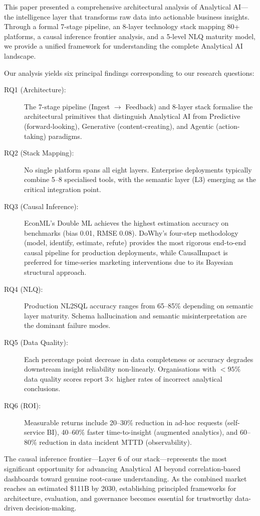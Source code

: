\documentclass[12pt, a4paper]{article}
\begin{document}
This paper presented a comprehensive architectural analysis of Analytical AI---the intelligence layer that transforms raw data into actionable business insights. Through a formal 7-stage pipeline, an 8-layer technology stack mapping 80+ platforms, a causal inference frontier analysis, and a 5-level NLQ maturity model, we provide a unified framework for understanding the complete Analytical AI landscape.

Our analysis yields six principal findings corresponding to our research questions:

\begin{description}
    \item[RQ1 (Architecture):] The 7-stage pipeline (Ingest $\rightarrow$ Feedback) and 8-layer stack formalise the architectural primitives that distinguish Analytical AI from Predictive (forward-looking), Generative (content-creating), and Agentic (action-taking) paradigms.
    \item[RQ2 (Stack Mapping):] No single platform spans all eight layers. Enterprise deployments typically combine 5--8 specialised tools, with the semantic layer (L3) emerging as the critical integration point.
    \item[RQ3 (Causal Inference):] EconML's Double ML achieves the highest estimation accuracy on benchmarks (bias 0.01, RMSE 0.08). DoWhy's four-step methodology (model, identify, estimate, refute) provides the most rigorous end-to-end causal pipeline for production deployments, while CausalImpact is preferred for time-series marketing interventions due to its Bayesian structural approach.
    \item[RQ4 (NLQ):] Production NL2SQL accuracy ranges from 65--85\% depending on semantic layer maturity. Schema hallucination and semantic misinterpretation are the dominant failure modes.
    \item[RQ5 (Data Quality):] Each percentage point decrease in data completeness or accuracy degrades downstream insight reliability non-linearly. Organisations with $<95\%$ data quality scores report 3$\times$ higher rates of incorrect analytical conclusions.
    \item[RQ6 (ROI):] Measurable returns include 20--30\% reduction in ad-hoc requests (self-service BI), 40--60\% faster time-to-insight (augmented analytics), and 60--80\% reduction in data incident MTTD (observability).
\end{description}

The causal inference frontier---Layer 6 of our stack---represents the most significant opportunity for advancing Analytical AI beyond correlation-based dashboards toward genuine root-cause understanding. As the combined market reaches an estimated \$111B by 2030, establishing principled frameworks for architecture, evaluation, and governance becomes essential for trustworthy data-driven decision-making.
\end{document}
